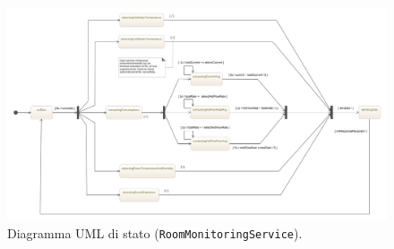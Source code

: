 \begin{figure}[H]
    \centering
    \includegraphics[width=\textwidth]{images/room-monitoring-service-state-diagram.jpeg}\hfill
    \caption{\label{rm-uml-state}Diagramma UML di stato (\texttt{RoomMonitoringService}).}
\end{figure}

\newpage